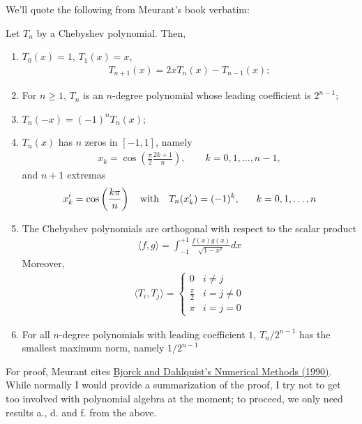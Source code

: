 \documentclass[11pt]{article}
\begin{document}
We'll quote the following from Meurant's book verbatim:
\begin{theorem}
Let $T_n$ by a Chebyshev polynomial. Then, \begin{enumerate}
\item $T_0(x) = 1$, $T_1(x) = x$, \begin{gather*}
T_{n+1} (x) = 2x T_n(x) - T_{n-1}(x);
\end{gather*}
\item For $n \ge 1$, $T_n$ is an $n$-degree polynomial whose leading coefficient is $2^{n-1}$;
\item $T_n(-x) = (-1)^n T_n(x)$;
\item $T_n(x)$ has $n$ zeros in $[-1,1]$, namely \begin{gather*}
x_k = \cos \left( \frac\pi2 \frac{2k+1}{n} \right), \hspace{2em} k=0,1,\dots,n-1,
\end{gather*}
and $n+1$ extremas \begin{gather*}
x_k' = \cos \left( \frac{k\pi}{n} \right) \hspace{1em} \text{with} \hspace{1em} T_n(x_k') = (-1)^k, \hspace{1.7em} k=0,1,\dots,n
\end{gather*}
\item The Chebyshev polynomials are orthogonal with respect to the scalar product \begin{gather*}
\langle f, g \rangle = \int_{-1}^{+1}\frac{f(x)g(x)}{\sqrt{1-x^2}}dx
\end{gather*}
Moreover, \begin{gather*}
\langle T_i, T_j \rangle = \left\{ \begin{matrix} 0 & i \neq j \\ \frac{\pi}{2} & i = j \neq 0 \\ \pi & i = j = 0 \end{matrix} \right.
\end{gather*}
\item For all $n$-degree polynomials with leading coefficient $1$, $T_n/2^{n-1}$ has the smallest maximum norm, namely $1/2^{n-1}$
\end{enumerate}
\end{theorem}

For proof, Meurant cites \hyperlink{https://dl.acm.org/doi/abs/10.5555/574892}{Bjorck and Dahlquist's Numerical Methods (1990)}. While normally I would provide a summarization of the proof, I try not to get too involved with polynomial algebra at the moment; to proceed, we only need results a., d. and f. from the above.
\end{document}
